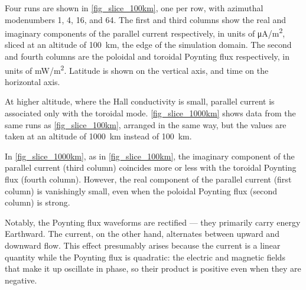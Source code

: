 Four runs are shown in \cref{fig_slice_100km}, one per row, with azimuthal modenumbers 1, 4, 16, and 64. The first and third columns show the real and imaginary components of the parallel current respectively, in units of \si{\uA/\m\squared}, sliced at an altitude of \SI{100}{\km}, the edge of the simulation domain. The second and fourth columns are the poloidal and toroidal Poynting flux respectively, in units of \si{\mW/\m\squared}. Latitude is shown on the vertical axis, and time on the horizontal axis. 

At higher altitude, where the Hall conductivity is small, parallel current is associated only with the toroidal mode. \cref{fig_slice_1000km} shows data from the same runs as \cref{fig_slice_100km}, arranged in the same way, but the values are taken at an altitude of \SI{1000}{\km} instead of \SI{100}{\km}. 

In \cref{fig_slice_1000km}, as in \cref{fig_slice_100km}, the imaginary component of the parallel current (third column) coincides more or less with the toroidal Poynting flux (fourth column). However, the real component of the parallel current (first column) is vanishingly small, even when the poloidal Poynting flux (second column) is strong. 


Notably, the Poynting flux waveforms are rectified --- they primarily carry energy Earthward. The current, on the other hand, alternates between upward and downward flow. This effect presumably arises because the current is a linear quantity while the Poynting flux is quadratic: the electric and magnetic fields that make it up oscillate in phase, so their product is positive even when they are negative. 

